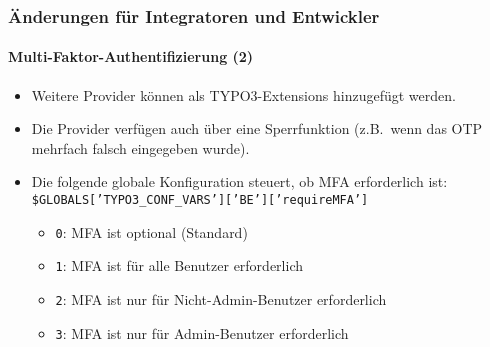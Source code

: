 %

\begin{frame}[fragile]
	\frametitle{Änderungen für Integratoren und Entwickler}
	\framesubtitle{Multi-Faktor-Authentifizierung (2)}

	\begin{itemize}

		\item Weitere Provider können als TYPO3-Extensions hinzugefügt werden.

		\item Die Provider verfügen auch über eine Sperrfunktion
			(z.B.\ wenn das OTP mehrfach falsch eingegeben wurde).

		\item Die folgende globale Konfiguration steuert, ob MFA erforderlich ist:\newline
			\smaller\texttt{\$GLOBALS['TYPO3\_CONF\_VARS']['BE']['requireMFA']}\normalsize

			\begin{itemize}
				\item \texttt{0}: MFA ist optional (Standard)
				\item \texttt{1}: MFA ist für alle Benutzer erforderlich
				\item \texttt{2}: MFA ist nur für Nicht-Admin-Benutzer erforderlich
				\item \texttt{3}: MFA ist nur für Admin-Benutzer erforderlich
			\end{itemize}

	\end{itemize}

\end{frame}

